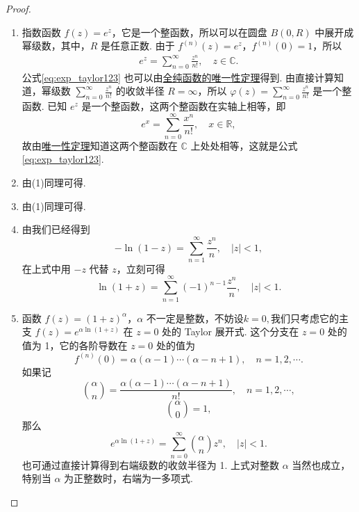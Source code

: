 \documentclass[../../main.tex]{subfiles}%
\begin{document}
\begin{proof}
\begin{enumerate}[(1)]
\item 指数函数 \( f(z) = e^z \)，它是一个整函数，所以可以在圆盘 \( B(0,R) \) 中展开成幂级数，其中，\( R \) 是任意正数. 由于 \( f^{(n)}(z) = e^z \)，\( f^{(n)}(0) = 1 \)，所以
\begin{align}
e^z = \sum_{n=0}^{\infty} \frac{z^n}{n!}, \quad z \in \mathbb{C}. \label{eq:exp_taylor123}
\end{align}
公式\eqref{eq:exp_taylor123} 也可以由\hyperref[theorem:定理4.3.7]{全纯函数的唯一性定理}得到. 由直接计算知道，幂级数 \( \sum_{n=0}^{\infty} \frac{z^n}{n!} \) 的收敛半径 \( R = \infty \)，所以 \( \varphi(z) = \sum_{n=0}^{\infty} \frac{z^n}{n!} \) 是一个整函数. 已知 \( e^z \) 是一个整函数，这两个整函数在实轴上相等，即
\[
e^x = \sum_{n=0}^{\infty} \frac{x^n}{n!}, \quad x \in \mathbb{R},
\]
故由\hyperref[theorem:定理4.3.7]{唯一性定理}知道这两个整函数在 \( \mathbb{C} \) 上处处相等，这就是公式 \eqref{eq:exp_taylor123}.

\item 由(1)同理可得.

\item 由(1)同理可得.

\item 由我们已经得到
\[
- \ln(1 - z) = \sum_{n=1}^{\infty} \frac{z^n}{n}, \quad |z| < 1,
\]
在上式中用 \( -z \) 代替 \( z \)，立刻可得
\[
\ln(1 + z) = \sum_{n=1}^{\infty} (-1)^{n - 1} \frac{z^n}{n}, \quad |z| < 1.
\]

\item 函数 \( f(z) = (1 + z)^{\alpha} \)，\( \alpha \) 不一定是整数，不妨设$k=0,$我们只考虑它的主支 \( f(z) = e^{\alpha \ln(1 + z)} \) 在 \( z = 0 \) 处的 Taylor 展开式. 这个分支在 \( z = 0 \) 处的值为 1，它的各阶导数在 \( z = 0 \) 处的值为
\[
f^{(n)}(0) = \alpha(\alpha - 1) \cdots (\alpha - n + 1), \quad n = 1, 2, \cdots.
\]
如果记
\[
\binom{\alpha}{n} = \frac{\alpha(\alpha - 1) \cdots (\alpha - n + 1)}{n!}, \quad n = 1, 2, \cdots,
\]
\[
\binom{\alpha}{0} = 1,
\]
那么
\[
e^{\alpha \ln(1 + z)} = \sum_{n=0}^{\infty} \binom{\alpha}{n} z^n, \quad |z| < 1.
\]
也可通过直接计算得到右端级数的收敛半径为 1. 上式对整数 \( \alpha \) 当然也成立，特别当 \( \alpha \) 为正整数时，右端为一多项式.
\end{enumerate}

\end{proof}
\end{document}
